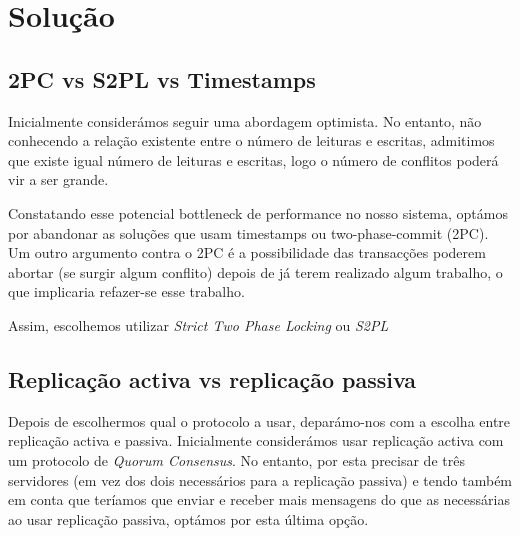 \section{Solução}

\subsection{2PC vs S2PL vs Timestamps}

Inicialmente considerámos seguir uma abordagem optimista. No entanto, não conhecendo a relação existente entre o número de leituras e escritas, admitimos que existe igual número de leituras e escritas, logo o número de conflitos poderá vir a ser grande. 

Constatando esse potencial bottleneck de performance no nosso sistema, optámos por abandonar as soluções que usam timestamps ou two-phase-commit (2PC). Um outro argumento contra o 2PC é a possibilidade das transacções poderem abortar (se surgir algum conflito) depois de já terem realizado algum trabalho, o que implicaria refazer-se esse trabalho.

Assim, escolhemos utilizar \textit{Strict Two Phase Locking} ou \textit{S2PL}

\subsection{Replicação activa vs replicação passiva}

Depois de escolhermos qual o protocolo a usar, deparámo-nos com a escolha entre replicação activa e passiva. Inicialmente considerámos usar replicação activa com um protocolo de \textit{Quorum Consensus}. No entanto, por esta precisar de três servidores (em vez dos dois necessários para a replicação passiva) e tendo também em conta que teríamos que enviar e receber mais mensagens do que as necessárias ao usar replicação passiva, optámos por esta última opção.
